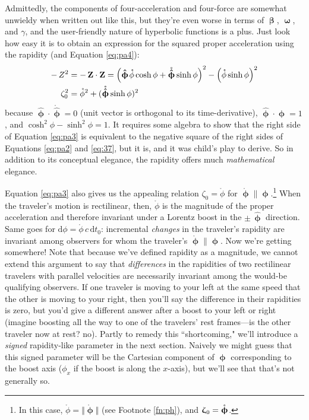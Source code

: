 \documentclass[12pt]{article}
\renewcommand{\vv}[1]{\mathbf{#1}}
\newcommand{\dd}[1]{\mathrm{d}#1}
\newcommand{\vvbeta}{\bm{\upbeta}}
\newcommand{\vvomega}{\bm{\upomega}}
\newcommand{\vvphi}{\bm{\upphi}}
\newcommand{\hatphi}{\bm{\hat{\upphi}}}
\newcommand{\vvzeta}{\bm{\upzeta}}
\begin{document}
Admittedly, the components of four-acceleration and four-force are somewhat unwieldy when written out like this, but they're even worse in terms of $\vvbeta$, $\vvomega$, and $\gamma$, and the user-friendly nature of hyperbolic functions is a plus. Just look how easy it is to obtain an expression for the squared proper acceleration using the rapidity (and Equation \ref{eq:pa4}):
\begin{equation}\label{eq:pa3}
\begin{split}
- \, Z^2 &= - \, \vv Z \cdot \vv Z = \left( \hatphi \mkern1.5mu \mathring{\phi} \cosh{\phi} + \mathring{\hatphi} \sinh{\phi} \right)^2 - \left( \mathring{\phi} \sinh{\phi} \right)^2 \\
\zeta_0^2 &= \mathring{\phi}^2 + (\mathring{\hatphi} \sinh{\phi})^2 
\end{split}
\end{equation}
because $\hatphi \cdot \mathring{\hatphi} = 0$ (unit vector is orthogonal to its time-derivative), $\hatphi \cdot \hatphi = 1$, and $\cosh^{2}{\phi} - \sinh^{2}{\phi} = 1$. It requires some algebra to show that the right side of Equation \ref{eq:pa3} is equivalent to the negative square of the right sides of Equations \ref{eq:pa2} and \ref{eq:37}, but it is, and it was child's play to derive. So in addition to its conceptual elegance, the rapidity offers much \emph{mathematical} elegance.

Equation \ref{eq:pa3} also gives us the appealing relation $\zeta_0 = \mathring{\phi}$ for $\mathring{\vvphi} \parallel \vvphi$.\footnote{In this case, $\mathring{\phi} = \Vert \mathring{\vvphi} \Vert$ (see Footnote \ref{fn:ph}), and $\vvzeta_{\mkern1mu 0} = \mathring{\vvphi}$.} When the traveler's motion is rectilinear, then, $\mathring{\phi}$ is the magnitude of the proper acceleration and therefore invariant under a Lorentz boost in the $\pm \, \hatphi$ direction. Same goes for $\dd \phi = \mathring{\phi} \, c \, \dd t_0$: incremental \emph{changes} in the traveler's rapidity are invariant among observers for whom the traveler's $\mathring{\vvphi} \parallel \vvphi$. Now we're getting somewhere! Note that because we've defined rapidity as a magnitude, we cannot extend this argument to say that \emph{differences} in the rapidities of two rectilinear travelers with parallel velocities are necessarily invariant among the would-be qualifying observers. If one traveler is moving to your left at the same speed that the other is moving to your right, then you'll say the difference in their rapidities is zero, but you'd give a different answer after a boost to your left or right (imagine boosting all the way to one of the travelers' rest frames---is the other traveler now at rest? no). Partly to remedy this ``shortcoming," we'll introduce a \emph{signed} rapidity-like parameter in the next section. Naively we might guess that this signed parameter will be the Cartesian component of $\vvphi$ corresponding to the boost axis ($\phi_x$ if the boost is along the $x$-axis), but we'll see that that's not generally so.
\end{document}
